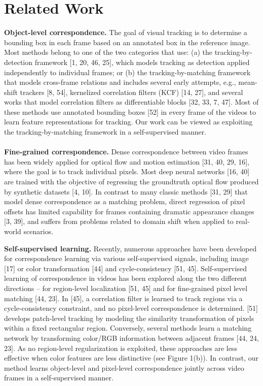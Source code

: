 \documentclass{article}
\begin{document}
\section{Related Work}
\textbf{Object-level correspondence.} The goal of visual tracking is to determine a bounding box in each frame based on an annotated box in the reference image. Most methods belong to one of the two categories that use: (a) the tracking-by-detection framework [1, 20, 46, 25], which models tracking as detection applied independently to individual frames; or (b) the tracking-by-matching framework that models cross-frame relations and includes several early attempts, e.g., mean-shift trackers [8, 54], kernelized correlation filters (KCF) [14, 27], and several works that model correlation filters as differentiable blocks [32, 33, 7, 47]. Most of these methods use annotated bounding boxes [52] in every frame of the videos to learn feature representations for tracking. Our work can be viewed as exploiting the tracking-by-matching framework in a self-supervised manner. \\
\\
\textbf{Fine-grained correspondence.} Dense correspondence between video frames has been widely applied for optical flow and motion estimation [31, 40, 29, 16], where the goal is to track individual pixels. Most deep neural networks [16, 40] are trained with the objective of regressing the groundtruth optical flow produced by synthetic datasets [4, 10]. In contrast to many classic methods [31, 29] that model dense correspondence as a matching problem, direct regression of pixel offsets has limited capability for frames containing dramatic appearance changes [3, 39], and suffers from problems related to domain shift when applied to real-world scenarios.

\textbf{Self-supervised learning.} Recently, numerous approaches have been developed for correspondence learning via various self-supervised signals, including image [17] or color transformation [44] and cycle-consistency [51, 45]. Self-supervised learning of correspondence in videos has been explored along the two different directions – for region-level localization [51, 45] and for fine-grained pixel level matching [44, 23]. In [45], a correlation filter is learned to track regions via a cycle-consistency constraint, and no pixel-level correspondence is determined. [51] develops patch-level tracking by modeling the similarity transformation of pixels within a fixed rectangular region. Conversely, several methods learn a matching network by transforming color/RGB information between adjacent frames [44, 24, 23]. As no region-level regularization is exploited, these approaches are less effective when color features are less distinctive (see Figure 1(b)). In contrast, our method learns object-level and pixel-level correspondence jointly across video frames in a self-supervised manner.
\end{document}
